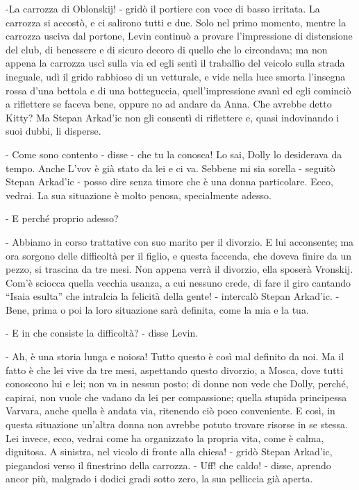 -La carrozza di Oblonskij! - gridò il portiere con voce di basso irritata. La carrozza si accostò, e ci salirono tutti e due. Solo nel primo momento, mentre la carrozza usciva dal portone, Levin continuò a provare l'impressione di distensione del club, di benessere e di sicuro decoro di quello che lo circondava; ma non appena la carrozza uscì sulla via ed egli sentì il traballìo del veicolo sulla strada ineguale, udì il grido rabbioso di un vetturale, e vide nella luce smorta l'insegna rossa d'una bettola e di una botteguccia, quell'impressione svanì ed egli cominciò a riflettere se faceva bene, oppure no ad andare da Anna. Che avrebbe detto Kitty? Ma Stepan Arkad'ic non gli consentì di riflettere e, quasi indovinando i suoi dubbi, li disperse. 

- Come sono contento - disse - che tu la conosca! Lo sai, Dolly lo desiderava da tempo. Anche L'vov è già stato da lei e ci va. Sebbene mi sia sorella - seguitò Stepan Arkad'ic - posso dire senza timore che è una donna particolare. Ecco, vedrai. La sua situazione è molto penosa, specialmente adesso. 

- E perché proprio adesso? 

- Abbiamo in corso trattative con suo marito per il divorzio. E lui acconsente; ma ora sorgono delle difficoltà per il figlio, e questa faccenda, che doveva finire da un pezzo, si trascina da tre mesi. Non appena verrà il divorzio, ella sposerà Vronskij. Com'è sciocca quella vecchia usanza, a cui nessuno crede, di fare il giro cantando ``Isaia esulta'' che intralcia la felicità della gente! - intercalò Stepan Arkad'ic. - Bene, prima o poi la loro situazione sarà definita, come la mia e la tua. 

- E in che consiste la difficoltà? - disse Levin. 

- Ah, è una storia lunga e noiosa! Tutto questo è così mal definito da noi. Ma il fatto è che lei vive da tre mesi, aspettando questo divorzio, a Mosca, dove tutti conoscono lui e lei; non va in nessun posto; di donne non vede che Dolly, perché, capirai, non vuole che vadano da lei per compassione; quella stupida principessa Varvara, anche quella è andata via, ritenendo ciò poco conveniente. E così, in questa situazione un'altra donna non avrebbe potuto trovare risorse in se stessa. Lei invece, ecco, vedrai come ha organizzato la propria vita, come è calma, dignitosa. A sinistra, nel vicolo di fronte alla chiesa! - gridò Stepan Arkad'ic, piegandosi verso il finestrino della carrozza. - Uff! che caldo! - disse, aprendo ancor più, malgrado i dodici gradi sotto zero, la sua pelliccia già aperta. 

